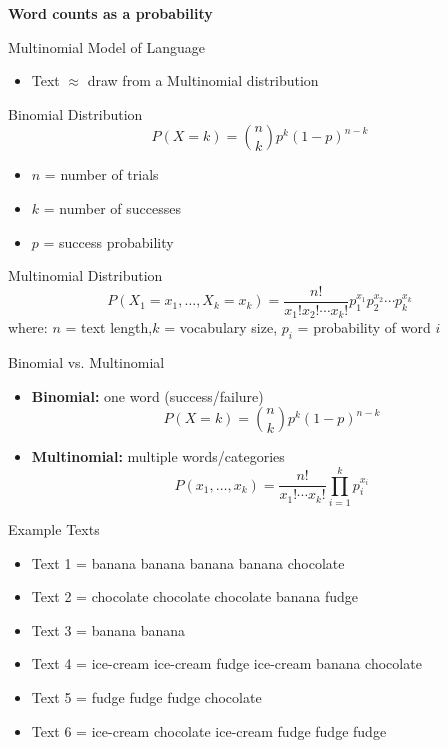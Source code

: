 \documentclass[11pt,aspectratio=43]{beamer}
\begin{document}
\begin{frame}[plain]
  \centering
  \vfill
  {\LARGE\bfseries
   Word counts as a probability\par}
  \vfill
\end{frame}

\begin{frame}{Multinomial Model of Language}
\begin{itemize}
\item Text $\approx$ draw from a Multinomial distribution
\end{itemize}
\end{frame}

\begin{frame}{Binomial Distribution}
\[
P(X=k)=\binom{n}{k}p^k(1-p)^{n-k}
\]
\begin{itemize}
\item $n$ = number of trials
\item $k$ = number of successes
\item $p$ = success probability
\end{itemize}
\end{frame}

\begin{frame}{Multinomial Distribution}
\[
P(X_1=x_1,\ldots,X_k=x_k)=
\frac{n!}{x_1!x_2!\cdots x_k!}
p_1^{x_1}p_2^{x_2}\cdots p_k^{x_k}
\]
where: $n$ = text length,\quad $k$ = vocabulary size,\quad
$p_i$ = probability of word $i$
\end{frame}

\begin{frame}{Binomial vs. Multinomial}
\begin{itemize}
\item \textbf{Binomial:} one word (success/failure)
\[
P(X=k)=\binom{n}{k}p^k(1-p)^{n-k}
\]
\item \textbf{Multinomial:} multiple words/categories
\[
P(x_1,\ldots,x_k)=\frac{n!}{x_1!\cdots x_k!}\prod_{i=1}^k p_i^{x_i}
\]
\end{itemize}
\end{frame}

\begin{frame}{Example Texts}
\small
\begin{itemize}
\item Text 1 = banana banana banana banana chocolate
\item Text 2 = chocolate chocolate chocolate banana fudge
\item Text 3 = banana banana
\item Text 4 = ice-cream ice-cream fudge ice-cream banana chocolate
\item Text 5 = fudge fudge fudge chocolate
\item Text 6 = ice-cream chocolate ice-cream fudge fudge fudge
\end{itemize}
\end{frame}
\end{document}
